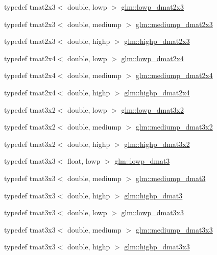 \begin{DoxyCompactItemize}
\item 
typedef tmat2x3$<$ double, lowp $>$ \hyperlink{group__core__precision_gada78eb998a9c716aedee01501456b94d}{glm\-::lowp\-\_\-dmat2x3}
\item 
typedef tmat2x3$<$ double, mediump $>$ \hyperlink{group__core__precision_ga0b187380697f66a25000b307db9cb41a}{glm\-::mediump\-\_\-dmat2x3}
\item 
typedef tmat2x3$<$ double, highp $>$ \hyperlink{group__core__precision_ga29884defff6f7109b1e99ef8a6ce7e0a}{glm\-::highp\-\_\-dmat2x3}
\item 
typedef tmat2x4$<$ double, lowp $>$ \hyperlink{group__core__precision_ga2aee5f52e32f0adcfdeb3142b50cb660}{glm\-::lowp\-\_\-dmat2x4}
\item 
typedef tmat2x4$<$ double, mediump $>$ \hyperlink{group__core__precision_ga837b8ead9807e10740dddfc99dabe8d7}{glm\-::mediump\-\_\-dmat2x4}
\item 
typedef tmat2x4$<$ double, highp $>$ \hyperlink{group__core__precision_ga2b1bf87a8f8fbc895127c6bfde7a271e}{glm\-::highp\-\_\-dmat2x4}
\item 
typedef tmat3x2$<$ double, lowp $>$ \hyperlink{group__core__precision_gac90dba962673ae315e5504a362d39b1c}{glm\-::lowp\-\_\-dmat3x2}
\item 
typedef tmat3x2$<$ double, mediump $>$ \hyperlink{group__core__precision_ga5ad217fad4f08abe72401409595076f2}{glm\-::mediump\-\_\-dmat3x2}
\item 
typedef tmat3x2$<$ double, highp $>$ \hyperlink{group__core__precision_gafe7ef85b0bc26e754cbf83fed54bf106}{glm\-::highp\-\_\-dmat3x2}
\item 
typedef tmat3x3$<$ float, lowp $>$ \hyperlink{group__core__precision_ga2a63ac35bb66e49374db9f699bef9597}{glm\-::lowp\-\_\-dmat3}
\item 
typedef tmat3x3$<$ double, mediump $>$ \hyperlink{group__core__precision_ga1a9a878d256cbb899a9c10bc7332995a}{glm\-::mediump\-\_\-dmat3}
\item 
typedef tmat3x3$<$ double, highp $>$ \hyperlink{group__core__precision_gafa89ae412491446e508782ddd9bc55c7}{glm\-::highp\-\_\-dmat3}
\item 
typedef tmat3x3$<$ double, lowp $>$ \hyperlink{group__core__precision_ga8cc302ca16a2ae1708143c85d50de0e7}{glm\-::lowp\-\_\-dmat3x3}
\item 
typedef tmat3x3$<$ double, mediump $>$ \hyperlink{group__core__precision_ga7c4e98b7bf5674658ba5e0892e9bf531}{glm\-::mediump\-\_\-dmat3x3}
\item 
typedef tmat3x3$<$ double, highp $>$ \hyperlink{group__core__precision_ga604f966e7bf042f298beb3b262287970}{glm\-::highp\-\_\-dmat3x3}

\end{DoxyCompactItemize}
